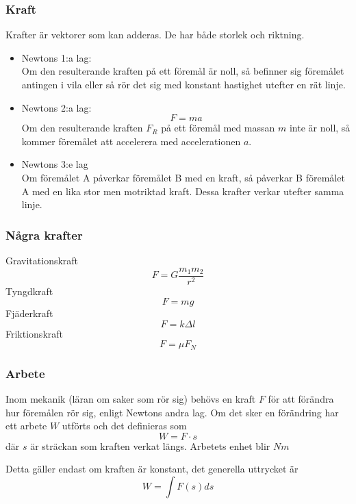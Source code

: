 \documentclass[11pt]{beamer}
\begin{document}
    \begin{frame}
        \frametitle{Kraft}
        Krafter är vektorer som kan adderas. De har både storlek och riktning.
        \begin{itemize}
            \item Newtons 1:a lag: \\
            Om den resulterande kraften på ett föremål är noll, så befinner sig föremålet antingen i vila eller så rör det sig med konstant hastighet utefter en rät linje.
            \item Newtons 2:a lag:
            \begin{equation}
                F=m a
            \end{equation}
            Om den resulterande kraften $F_R$ på ett föremål med massan $m$ inte är noll, så kommer föremålet att accelerera med accelerationen $a$.
            \item Newtons 3:e lag \\
            Om föremålet A påverkar föremålet B med en kraft, så påverkar B föremålet A med en lika stor men motriktad kraft. Dessa krafter verkar utefter samma linje.
        \end{itemize}
    \end{frame}
    \begin{frame}
        \frametitle{Några krafter}
        Gravitationskraft
        \begin{equation}
            F=G \frac{m_1 m_2}{r^2}
        \end{equation}
        Tyngdkraft
        \begin{equation}
            F=m g
        \end{equation}
        Fjäderkraft
        \begin{equation}
            F=k \Delta l
        \end{equation}
        Friktionskraft
        \begin{equation}
            F=\mu F_N
        \end{equation}


    \end{frame}

        \begin{frame}
        \frametitle{Arbete}
        Inom mekanik (läran om saker som rör sig) behövs en kraft $F$ för att förändra hur föremålen rör sig, enligt Newtons andra lag.
        Om det sker en förändring har ett arbete $W$ utförts och det definieras som
        \begin{equation}
            W = F \cdot s
        \end{equation}
        där $s$ är sträckan som kraften verkat längs. Arbetets enhet blir $Nm$

        \vspace{10}
        Detta gäller endast om kraften är konstant, det generella uttrycket är
        \begin{equation}
            W = \int F(s) ds
        \end{equation}

    \end{frame}
\end{document}
